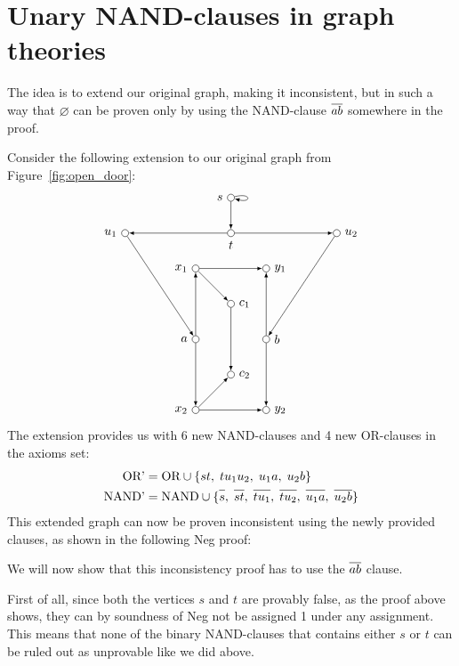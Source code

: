 \section{Unary NAND-clauses in graph theories}
\label{sec:Unary NAND-clauses in graph theories}

The idea is to extend our original graph, making it inconsistent, but in such a way that $\varnothing$ can be proven only by using the NAND-clause $\ol{ab}$ somewhere in the proof.

Consider the following extension to our original graph from Figure~\ref{fig:open_door}:
\[
  \begin{tikzpicture}
    [
    point/.style={circle,draw,inner sep=0pt,minimum size=2mm},
    collection/.style={thick,rectangle,draw,inner sep=0pt,minimum height=14mm, minimum width= 9mm}
    ]
    \node (a) at (0,2) [point,label=left:$a$] {};
    \node (x1) at (0,4) [point,label=left:$x_1$] {};
    \node (x2) at (0,0) [point,label=left:$x_2$] {};
    \node (b) at (2,2) [point,label=right:$b$] {};
    \node (y1) at (2,4) [point,label=right:$y_1$] {};
    \node (y2) at (2,0) [point,label=right:$y_2$] {};
    \node (c1) at (1,3) [point,label=right:$c_1$] {};
    \node (c2) at (1,1) [point,label=right:$c_2$] {};
    \node (s) at (1,6) [point,label=left:$s$] {};
    \node (t) at (1,5) [point,label=below:$t$] {};
    \node (u1) at (-2,5) [point,label=left:$u_1$] {};
    \node (u2) at (4,5) [point,label=right:$u_2$] {};
    \draw [-latex] (a) to (x1);
    \draw [-latex] (a) to (x2);
    \draw [-latex] (b) to (y1);
    \draw [-latex] (b) to (y2);
    \draw [-latex] (x1) to (y1);
    \draw [-latex] (x1) to (c1);
    \draw [-latex] (x2) to (y2);
    \draw [-latex] (x2) to (c2);
    \draw [-latex] (c1) to (c2);
    \draw [-latex,loop right] (s) to (s);
    \draw [-latex] (s) to (t);
    \draw [-latex] (t) to (u1);
    \draw [-latex] (t) to (u2);
    \draw [-latex] (u1) to (a);
    \draw [-latex] (u2) to (b);
  \end{tikzpicture}
\]
The extension provides us with 6 new NAND-clauses and 4 new OR-clauses in the axioms set:
\begin{align}
  \text{OR'} &= \text{OR} \cup \{st,\; tu_1u_2,\; u_1a,\; u_2b \}\\
  \text{NAND'} &= \text{NAND} \cup \{\ol{s},\; \ol{st},\; \ol{tu_1},\; \ol{tu_2},\; \ol{u_1a},\; \ol{u_2b} \}
\end{align}
This extended graph can now be proven inconsistent using the newly provided clauses, as shown in the following Neg proof:
\begin{prooftree*}
  \Hypo{\dots}
\end{prooftree*}

We will now show that this inconsistency proof has to use the $\ol{ab}$ clause.

First of all, since both the vertices $s$ and $t$ are provably false, as the proof above shows, they can by soundness of Neg not be assigned 1 under any assignment.
This means that none of the binary NAND-clauses that contains either $s$ or $t$ can be ruled out as unprovable like we did above.
